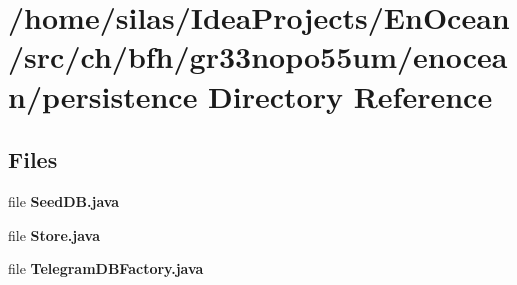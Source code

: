 \section{/home/silas/\+Idea\+Projects/\+En\+Ocean/src/ch/bfh/gr33nopo55um/enocean/persistence Directory Reference}
\label{dir_1a327dc9b6d3704ac51f8bf9e6f14206}
\subsection*{Files}
\begin{DoxyCompactItemize}
\item 
file {\bf Seed\+D\+B.\+java}
\item 
file {\bf Store.\+java}
\item 
file {\bf Telegram\+D\+B\+Factory.\+java}
\end{DoxyCompactItemize}
